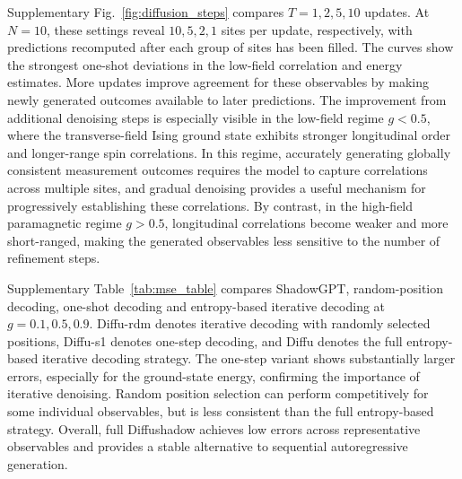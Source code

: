 \documentclass[11pt,a4paper]{article}
\newcommand{\TBD}[1]{\textcolor{red!70!black}{\textsf{[TBD: #1]}}}
\begin{document}
Supplementary Fig.~\ref{fig:diffusion_steps} compares $T=1,2,5,10$ updates. At $N=10$, these
settings reveal $10,5,2,1$ sites per update, respectively, with
predictions recomputed after each group of sites has been filled.
The curves show the strongest
one-shot deviations in the low-field correlation and energy estimates.
More updates improve agreement for these observables by making newly
generated outcomes available to later predictions. The improvement from additional denoising steps is especially visible in the low-field regime \(g < 0.5\), where the transverse-field Ising ground state exhibits stronger longitudinal order and longer-range spin correlations. In this regime, accurately generating globally consistent measurement outcomes requires the model to capture correlations across multiple sites, and gradual denoising provides a useful mechanism for progressively establishing these correlations. By contrast, in the high-field paramagnetic regime \(g > 0.5\), longitudinal correlations become weaker and more short-ranged, making the generated observables less sensitive to the number of refinement steps.

Supplementary Table~\ref{tab:mse_table} compares ShadowGPT, random-position
decoding, one-shot decoding and entropy-based iterative decoding at
$g=0.1,0.5,0.9$. Diffu-rdm denotes iterative decoding with randomly selected positions, Diffu-s1 denotes one-step decoding, and Diffu denotes the full entropy-based iterative decoding strategy. The one-step variant shows substantially larger errors, especially for the ground-state energy, confirming the importance of iterative denoising. Random position selection can perform competitively for some individual observables, but is less consistent than the full entropy-based strategy. Overall, full Diffushadow achieves low errors across representative observables and provides a stable alternative to sequential autoregressive generation.
\end{document}
